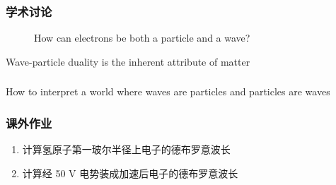 \begin{frame}
    \frametitle{学术讨论}
        \begin{figure}
            \centering
            {\color{red} How can electrons be both a particle and a wave?}
        \end{figure}
    \setcounter{subfigure}{0}
\end{frame}

\begin{frame}  
    \begin{tcolorbox3}[Conclusion]
    Wave-particle duality is the inherent attribute of matter
    \end{tcolorbox3} 
\end{frame} 

\begin{frame}
    \frametitle{}
    \centering
    {
      \large  How to interpret a world where waves are particles and particles are waves
    }
\end{frame}

\begin{frame}
    \frametitle{课外作业}
    \begin{enumerate}
        \item 计算氢原子第一玻尔半径上电子的德布罗意波长
        \item 计算经 50 V 电势装成加速后电子的德布罗意波长
    \end{enumerate}
\end{frame}
